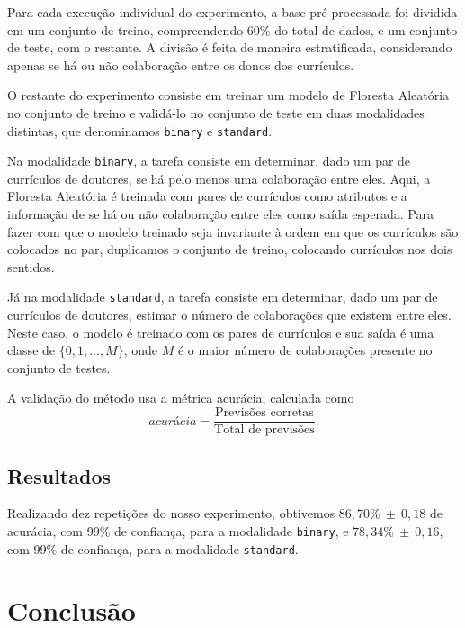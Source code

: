 \documentclass[12pt]{article}
\begin{document}
Para cada execução individual do experimento, a base pré-processada foi dividida em um conjunto de treino, compreendendo 60\% do total de dados, e um conjunto de teste, com o restante.
A divisão é feita de maneira estratificada, considerando apenas se há ou não colaboração entre os donos dos currículos.

O restante do experimento consiste em treinar um modelo de Floresta Aleatória no conjunto de treino e validá-lo no conjunto de teste em duas modalidades distintas, que denominamos \texttt{binary} e \texttt{standard}.

Na modalidade \texttt{binary}, a tarefa consiste em determinar, dado um par de currículos de doutores, se há pelo menos uma colaboração entre eles.
Aqui, a Floresta Aleatória é treinada com pares de currículos como atributos e a informação de se há ou não colaboração entre eles como saída esperada.
Para fazer com que o modelo treinado seja invariante à ordem em que os currículos são colocados no par, duplicamos o conjunto de treino, colocando currículos nos dois sentidos.

Já na modalidade \texttt{standard}, a tarefa consiste em determinar, dado um par de currículos de doutores, estimar o número de colaborações que existem entre eles.
Neste caso, o modelo é treinado com os pares de currículos e sua saída é uma classe de $\{0, 1, ..., M\}$, onde $M$ é o maior número de colaborações presente no conjunto de testes.

A validação do método usa a métrica acurácia, calculada como
\begin{equation}
  \textit{acurácia} = \frac{\text{Previsões corretas}}{\text{Total de previsões}}.
\end{equation}


\subsection{Resultados}
\label{sec:results}
Realizando dez repetições do nosso experimento, obtivemos $86,70\%~\pm~0,18$ de acurácia, com 99\% de confiança, para a modalidade \texttt{binary}, e $78,34\%~\pm~0,16$, com 99\% de confiança, para a modalidade \texttt{standard}.



\section{Conclusão}
\label{sec:conclusion}



\end{document}
